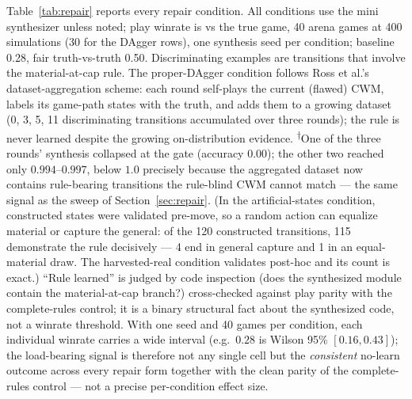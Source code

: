 \documentclass[11pt]{article}
\theoremstyle{remark}
\begin{document}
Table~\ref{tab:repair} reports every repair condition. All conditions use the mini synthesizer unless noted; play winrate is vs the true game, 40 arena games at 400 simulations (30 for the DAgger rows), one synthesis seed per condition; baseline 0.28, fair truth-vs-truth 0.50. Discriminating examples are transitions that involve the material-at-cap rule. The proper-DAgger condition follows Ross et al.'s dataset-aggregation scheme: each round self-plays the current (flawed) CWM, labels its game-path states with the truth, and adds them to a growing dataset (0, 3, 5, 11 discriminating transitions accumulated over three rounds); the rule is never learned despite the growing on-distribution evidence. \textsuperscript{$\dagger$}One of the three rounds' synthesis collapsed at the gate (accuracy $0.00$); the other two reached only $0.994$--$0.997$, below $1.0$ precisely because the aggregated dataset now contains rule-bearing transitions the rule-blind CWM cannot match --- the same signal as the sweep of Section~\ref{sec:repair}. (In the artificial-states condition, constructed states were validated pre-move, so a random action can equalize material or capture the general: of the 120 constructed transitions, 115 demonstrate the rule decisively --- 4 end in general capture and 1 in an equal-material draw. The harvested-real condition validates post-hoc and its count is exact.) ``Rule learned'' is judged by code inspection (does the synthesized module contain the material-at-cap branch?) cross-checked against play parity with the complete-rules control; it is a binary structural fact about the synthesized code, not a winrate threshold. With one seed and 40 games per condition, each individual winrate carries a wide interval (e.g.\ $0.28$ is Wilson 95\% $[0.16, 0.43]$); the load-bearing signal is therefore not any single cell but the \emph{consistent} no-learn outcome across every repair form together with the clean parity of the complete-rules control --- not a precise per-condition effect size.
\end{document}
